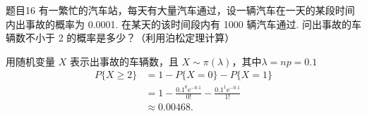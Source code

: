 \begin{question}{题目16}
    有一繁忙的汽车站，每天有大量汽车通过，设一辆汽车在一天的某段时间内出事故的概率为 0.0001. 在某天的该时间段内有 1000 辆汽车通过. 问出事故的车辆数不小于 2 的概率是多少？（利用泊松定理计算）
\end{question}
\begin{solution}
    用随机变量 $X$ 表示出事故的车辆数，且 $X \sim \pi(\lambda)$，其中$\lambda = np = 0.1$
    $$
        \begin{aligned}
            P\{ X \geqslant 2\}
             & = 1 - P\{X=0\} - P\{X=1\}                                                   \\
             & = 1 - \frac{0.1^0\mathrm{e}^{-0.1}}{0!} - \frac{0.1^1\mathrm{e}^{-0.1}}{1!} \\
             & \approx 0.00468.
        \end{aligned}
    $$
\end{solution}


